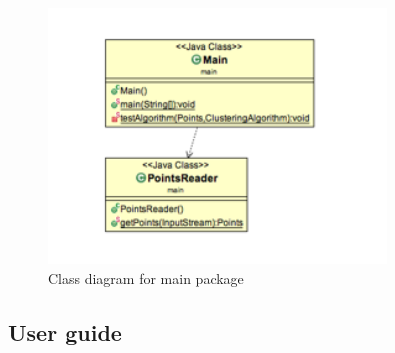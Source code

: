 \documentclass[12pt, a4paper, notitlepage, oneside]{article}
\begin{document}
\begin{itemize}
	\begin{figure}[!ht]
 	\centering
	\includegraphics[width=0.8\textwidth]{images/main_package.png}
 	\caption[]
	{Class diagram for main package}
	\end{figure}


\end{itemize}


\subsection{User guide}




\end{document}
